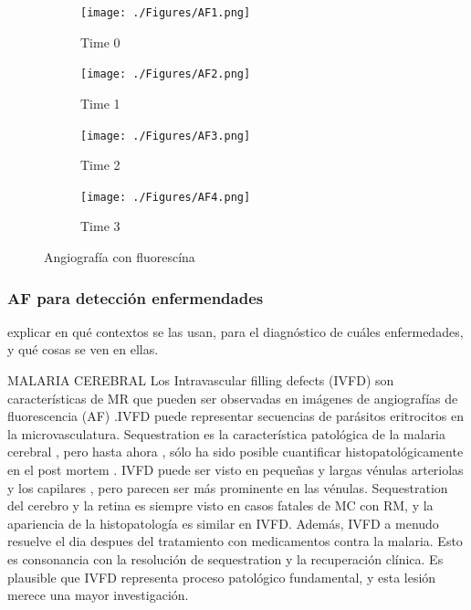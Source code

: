 \begin{figure}[H]
	\centering
	\begin{subfigure}[b]{0.23\textwidth}
        \texttt{[image: ./Figures/AF1.png]}
        \caption{Time 0}
        \label{fig:af1}
    \end{subfigure}
	\begin{subfigure}[b]{0.23\textwidth}
        \texttt{[image: ./Figures/AF2.png]}
        \caption{Time 1}
        \label{fig:af2}
    \end{subfigure}
	\begin{subfigure}[b]{0.23\textwidth}
        \texttt{[image: ./Figures/AF3.png]}
        \caption{Time 2}
        \label{fig:af3}
    \end{subfigure}
    	\begin{subfigure}[b]{0.23\textwidth}
        \texttt{[image: ./Figures/AF4.png]}
        \caption{Time 3}
        \label{fig:af4}
    \end{subfigure}
	\label{fig:retina}
	\caption{Angiograf\'ia con fluoresc\'ina}
\end{figure}






\subsubsection{AF para detección enfermendades }

explicar en qué contextos se las usan, para el diagnóstico de cuáles enfermedades, y qué cosas se ven en ellas.

MALARIA CEREBRAL
Los Intravascular filling defects (IVFD) son características de  MR que pueden ser observadas en imágenes de  angiografías de fluorescencia (AF) .IVFD puede representar secuencias de parásitos eritrocitos en la microvasculatura. Sequestration es la característica patológica de la malaria cerebral , pero hasta ahora , sólo ha sido posible cuantificar histopatológicamente en el post mortem . IVFD puede ser visto en pequeñas y largas vénulas arteriolas y los capilares , pero parecen ser más prominente en las vénulas. Sequestration del cerebro y la retina es siempre visto en casos fatales de MC con RM, y la apariencia de la histopatología es similar en IVFD. Además, IVFD a menudo resuelve el dia despues del tratamiento con medicamentos contra la malaria. Esto es consonancia con  la resolución de sequestration y la recuperación clínica. Es plausible que  IVFD representa proceso patológico fundamental, y esta lesión merece una mayor investigación. \cite{zhao2015automated}

